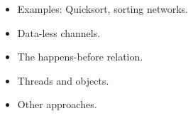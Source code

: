 \documentclass[notes,color]{sepslide0}
\begin{document}

\begin{slide}

\begin{itemize}
\item Examples: Quicksort, sorting networks.

\item 
Data-less channels.

\item
The happens-before relation.

\item
Threads and objects.

\item
Other approaches.
\end{itemize}
\end{slide}
\end{document}
